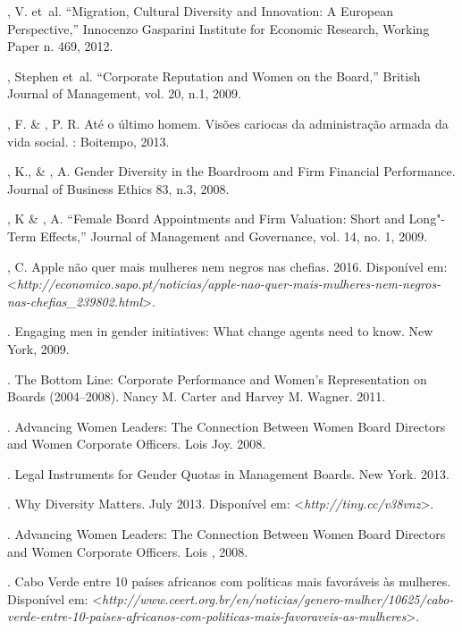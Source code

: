 \begin{Parskip}
, V. et~al. ``Migration, Cultural Diversity and Innovation: A
European Perspective,'' Innocenzo Gasparini Institute for Economic
Research, Working Paper n. 469, 2012.

, Stephen et~al. ``Corporate Reputation and Women on the
Board,'' British Journal of Management, vol. 20, n.1, 2009.

, F. \& , P. R. Até o último homem. Visões cariocas da
administração armada da vida social. : Boitempo, 2013.

, K., \& , A. Gender Diversity in the Boardroom and
Firm Financial Performance. Journal of Business Ethics 83, n.3, 2008.

, K \& , A. ``Female Board Appointments and Firm
Valuation: Short and Long"-Term Effects,'' Journal of Management and
Governance, vol. 14, no. 1, 2009.

, C. Apple não quer mais mulheres nem negros nas chefias. 2016.
Disponível em: \textless{}\emph{http://economico.sapo.pt/noticias/apple-nao-quer-mais-mulheres-nem-negros-nas-chefias\_239802.html}\textgreater{}.

. Engaging men in gender initiatives: What change agents need to
know. New York, 2009.

. The Bottom Line: Corporate Performance and Women's
Representation on Boards (2004--2008). Nancy M. Carter and Harvey M.
Wagner. 2011.

. Advancing Women Leaders: The Connection Between Women Board
Directors and Women Corporate Officers. Lois Joy. 2008.

.  Legal Instruments for Gender Quotas in Management Boards.
New York. 2013.

. Why Diversity Matters. July 2013.
Disponível em: \textless{}\emph{http://tiny.cc/v38vnz}\textgreater{}.

. Advancing Women Leaders: The Connection Between Women Board
Directors and Women Corporate Officers. Lois , 2008.

. Cabo Verde entre 10 países africanos com políticas mais
favoráveis às mulheres.
Disponível em: \textless{}\emph{http://www.ceert.org.br/en/noticias/genero-mulher/10625/cabo-verde-entre-10-paises-africanos-com-politicas-mais-favoraveis-as-mulheres}\textgreater{}.


\end{Parskip}
